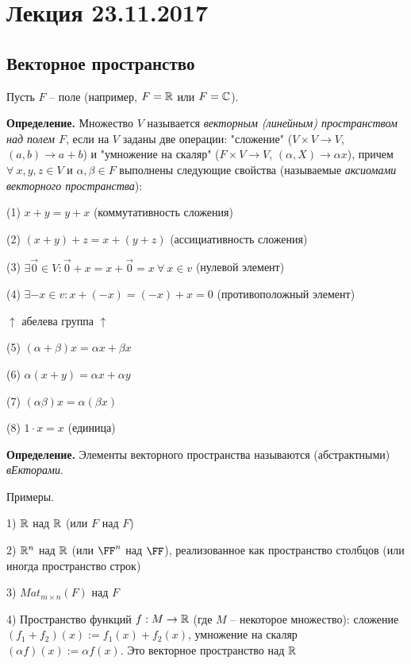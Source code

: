 \section{Лекция 23.11.2017}

\subsection{Векторное пространство}

\bigskip
Пусть $F$ -- поле (например, $F = \mathbb{R}$ или $F = \mathbb{C}$).

\bigskip
\textbf{Определение.} Множество $V$ называется \textit{векторным (линейным) пространством над полем $F$}, если на $V$ заданы две операции: "сложение" ($V \times V \rightarrow V$, $(a,b) \rightarrow a+b$) и "умножение на скаляр" ($F \times V \rightarrow V$, $(\alpha, X) \rightarrow \alpha x$), причем $\forall \ x, y, z \in V$ и $\alpha, \beta \in F$ выполнены следующие свойства (называемые \textit{аксиомами векторного пространства}):

(1) $x + y = y + x$ (коммутативность сложения)

(2) $(x+y)+z = x+(y+z)$ (ассициативность сложения)

(3) $\exists \overrightarrow{0} \in V: \overrightarrow{0} + x = x + \overrightarrow{0} = x \ \forall \ x \in v$ (нулевой элемент)

(4) $\exists -x \in v: x+(-x)=(-x)+x=0$ (противоположный элемент)

$\uparrow$ абелева группа $\uparrow$

(5) $(\alpha + \beta) x = \alpha x + \beta x$

(6) $\alpha (x + y) = \alpha x + \alpha y$

(7) $(\alpha \beta) x  = \alpha (\beta x)$

(8) $ 1 \cdot x = x $ (единица)

\bigskip
\textbf{Определение.} Элементы векторного пространства называются (абстрактными) \textit{вЕкторами}.

\bigskip
Примеры. 

1) $\mathbb{R}$ над $\mathbb{R}$ (или $F$ над $F$)

2) $\mathbb{R}^n$ над $\mathbb{R}$ (или $\FF^n$ над $\FF$), реализованное как пространство столбцов (или иногда пространство строк)

3) $Mat_{m \times n} (F)$ над $F$

4) Пространство функций $f: M \rightarrow \mathbb{R}$ (где $M$ -- некоторое множество): сложение $(f_1 + f_2)(x) := f_1(x) + f_2(x)$, умножение на скаляр $(\alpha f)(x) := \alpha f(x)$. Это векторное пространство над $\mathbb{R}$

